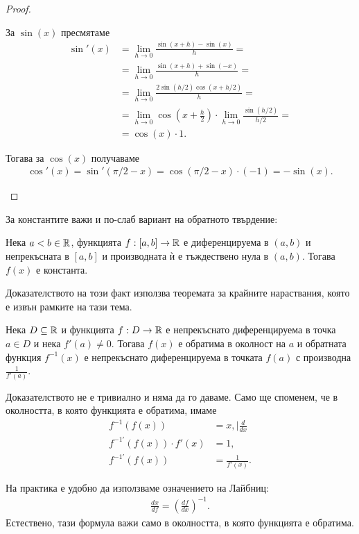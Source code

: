\documentclass[numbers=endperiod, bibliography=totocnumbered]{scrartcl}
\begin{document}
\begin{proof}
\begin{enumerate}
    За \( \sin(x) \) пресмятаме
    \begin{align*}
      \sin'(x)
      &=
      \lim_{h \to 0} \frac {\sin(x+h) - \sin(x)} h
      = \\ &=
      \lim_{h \to 0} \frac {\sin(x+h) + \sin(-x)} h
      = \\ &=
      \lim_{h \to 0} \frac {2 \sin(h / 2) \cos(x+h/2)} h
      = \\ &=
      \lim_{h \to 0} \cos \left(x + \frac h 2 \right) \cdot \lim_{h \to 0} \frac {\sin(h / 2)} {h/2}
      = \\ &=
      \cos(x) \cdot 1.
    \end{align*}

    Тогава за \( \cos(x) \) получаваме
    \begin{align*}
      \cos'(x) = \sin'(\pi / 2 - x) = \cos(\pi / 2 - x) \cdot (-1) = -\sin(x).
    \end{align*}
  \end{enumerate}
\end{proof}

За константите важи и по-слаб вариант на обратното твърдение:
\begin{proposition}\label{thm:zero_derivative}
  Нека \( a < b \in \mathbb{R} \), функцията \( f: [a, b] \to \mathbb{R} \) е диференцируема в \( (a, b) \) и непрекъсната в \( [a, b] \) и производната ѝ е тъждествено нула в \( (a, b) \). Тогава \( f(x) \) е константа.
\end{proposition}
\begin{note}
  Доказателството на този факт използва теоремата за крайните нараствания, която е извън рамките на тази тема.
\end{note}

\begin{theorem}
  Нека \( D \subseteq \mathbb{R} \) и функцията \( f: D \to \mathbb{R} \) е непрекъснато диференцируема в точка \( a \in D \) и нека \( f'(a) \neq 0 \). Тогава \( f(x) \) е обратима в околност на \( a \) и обратната функция \( f^{-1} (x) \) е непрекъснато диференцируема в точката \( f(a) \) с производна \( \frac 1 {f'(a)} \).
\end{theorem}
\begin{note}
  Доказателството не е тривиално и няма да го даваме. Само ще споменем, че в околността, в която функцията е обратима, имаме
  \begin{align*}
    f^{-1}(f(x)) &= x, \mid \frac d {dx}
    \\
    f^{-1'}(f(x)) \cdot f'(x) &= 1,
    \\
    f^{-1'}(f(x)) &= \frac 1 {f'(x)}.
  \end{align*}

  На практика е удобно да използваме означението на Лайбниц:
  \begin{align*}
    \frac {dx} {df} = {\left( \frac {df} {dx} \right)}^{-1}.
  \end{align*}
  Естествено, тази формула важи само в околността, в която функцията е обратима.
\end{note}
\end{document}
